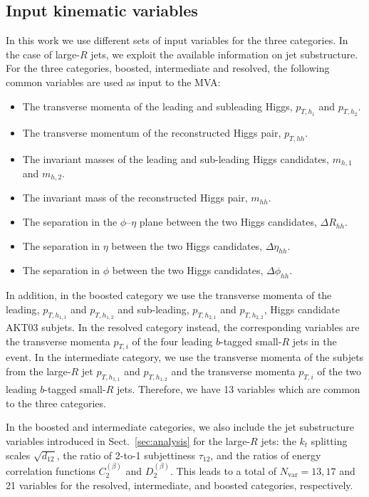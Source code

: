  \subsection{Input kinematic variables}
 \label{sec:input}

In this work we use different sets of
input variables for the three categories.
%
In the case of large-$R$ jets, we  exploit the available
information  on jet substructure.
%
For the three categories, boosted, intermediate and resolved,
the following common variables are used as input to the MVA:
\begin{itemize}
\item The transverse momenta of the leading and subleading Higgs, $p_{T,h_1}$ and $p_{T,h_2}$.
\item The transverse momentum of the reconstructed Higgs pair, $p_{T,hh}$.
\item The invariant masses of the leading and sub-leading Higgs candidates, $m_{h,1}$ and $m_{h,2}$.
\item The invariant mass of the reconstructed Higgs pair, $m_{hh}$.
\item The separation in the $\phi$--$\eta$ plane
  between the two Higgs candidates, $\Delta R_{hh}$.
  \item The separation in $\eta$  between the two Higgs candidates, $\Delta \eta_{hh}$.
\item The separation in $\phi$  between the two Higgs candidates, $\Delta \phi_{hh}$.
\end{itemize}
In addition, in the boosted category we use
  the transverse momenta of the leading, $p_{T,h_{1,1}}$ and $p_{T,h_{1,2}}$ and
  sub-leading, $p_{T,h_{2,1}}$ and $p_{T,h_{2,2}}$, Higgs candidate AKT03 subjets.
  In the resolved category instead,
  the corresponding variables are
  the transverse momenta $p_{T,i}$ of the four leading 
  $b$-tagged small-$R$ jets in the event.
  In the intermediate category, we use the
  transverse momenta of the subjets
  from the large-$R$ jet $p_{T,h_{1,1}}$ and $p_{T,h_{1,2}}$ and the
 transverse momenta $p_{T,i}$ of the two leading 
  $b$-tagged small-$R$ jets.
 Therefore, we have 13 variables which are common to the three categories.

 In the boosted and intermediate categories, we also include the jet substructure
 variables introduced in Sect.~\ref{sec:analysis} for the
 large-$R$ jets: the $k_t$ splitting scales
 $\sqrt{d_{12}}$, the ratio of 2-to-1 subjettiness $\tau_{12}$,
 and the ratios of energy correlation functions $C^{(\beta)}_2$ and
 $D_2^{(\beta)}$.
 This leads to
 a total of $N_{\mathrm{var}}=13,17$ and 21 variables for the
resolved, intermediate, and boosted categories, respectively.


